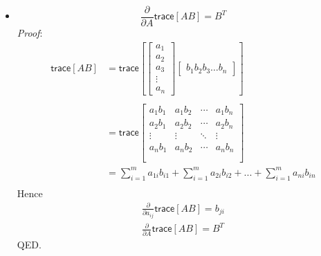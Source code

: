 \documentclass[11pt]{article}
\begin{document}
{\begin{itemize}
Hence
\begin{equation}
    \begin{split}
        \frac{\partial \ln\mathsf{det}M}{\partial M} &= \frac{\partial \ln\mathsf{det}M}{\partial \mathsf{det}M}\frac{\partial \mathsf{det}M}{\partial M}\\
        &= \frac{1}{\mathsf{det}M}\mathsf{det}M^{-T}\\
        &= M^{-T}
    \end{split}
\end{equation}
QED.
\ \\
 \item $$ \frac{\partial}{\partial  A} \mathsf{trace}[AB]  = B^T$$
 \emph{Proof}:
\begin{equation}
    \begin{split}
         \mathsf{trace}[AB] &= \mathsf{trace} \left[\begin{bmatrix}a_1\\
a_2\\a_3\\
\vdots\\
a_n
\end{bmatrix}\begin{bmatrix}b_1
b_2 b_3
\hdots
b_n
\end{bmatrix}\right]\\\\
&=\mathsf{
trace}\begin{bmatrix}
a_{1}b_{1}&a_{1}b_{2}&\cdots &a_{1}b_{n} \\
a_{2}b_{1}&a_{2}b_{2}&\cdots &a_{2}b_{n} \\
\vdots & \vdots & \ddots & \vdots\\
a_{n}b_{1}&a_{n}b_{2}&\cdots &a_{n}b_{n}\\\\
\end{bmatrix}\\
&=\sum\limits_{i=1}^{m}a_{1i}b_{i1}+\sum\limits_{i=1}^{m}a_{2i}b_{i2} + ... +\sum\limits_{i=1}^{m}a_{ni}b_{in}\\
    \end{split}
\end{equation}
Hence
\begin{gather*}
        \frac{\partial}{\partial  a_{ij}} \mathsf{trace}[AB] = b_{ji}\\
        \frac{\partial}{\partial  A} \mathsf{trace}[AB]  = B^T
\end{gather*}
QED.
\end{itemize}
\ \\

}
\end{document}
